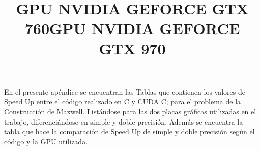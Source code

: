 \chapter{}
\label{ap1}

En el presente apéndice se encuentran las Tablas que contienen los valores de Speed Up entre el código realizado en C y CUDA C; para el problema de la Construcción de Maxwell.
Listándose para las dos placas gráficas utilizadas en el trabajo, diferenciándose en simple y doble precisión.
Además se encuentra la tabla que hace la comparación de Speed Up de simple y doble precisión según el código y la GPU utilizada.


\label{apend_MxC}

\title{\textbf{GPU NVIDIA GEFORCE GTX 760}}

\label{apend_MxC_760}









\newpage

\title{\textbf{GPU NVIDIA GEFORCE GTX 970}}

\label{apend_MxC_970}










